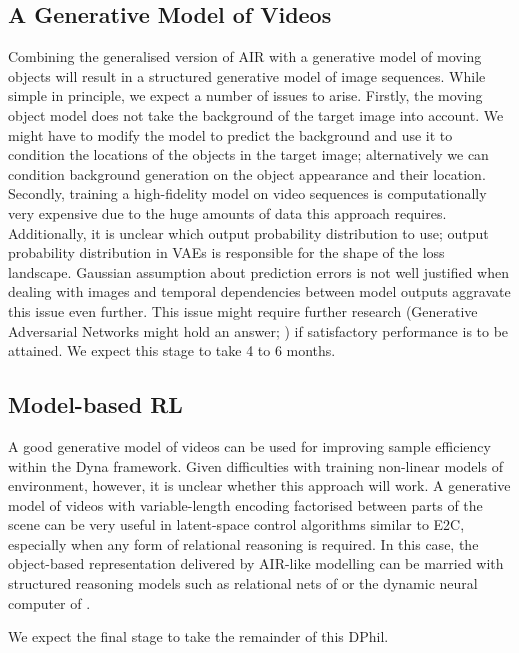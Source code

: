     \subsection{A Generative Model of Videos}
        Combining the generalised version of AIR with a generative model of moving objects will result in a structured generative model of image sequences. While simple in principle, we expect a number of issues to arise. Firstly, the moving object model does not take the background of the target image into account. We might have to modify the model to predict the background and use it to condition the locations of the objects in the target image; alternatively we can condition background generation on the object appearance and their location. 
        Secondly, training a high-fidelity model on video sequences is computationally very expensive due to the huge amounts of data this approach requires.
        Additionally, it is unclear which output probability distribution to use; output probability distribution in VAEs is responsible for the shape of the loss landscape. Gaussian assumption about prediction errors is not well justified when dealing with images and temporal dependencies between model outputs aggravate this issue even further. This issue might require further research (Generative Adversarial Networks might hold an answer; \cite{Wenzhe2016}) if satisfactory performance is to be attained. We expect this stage to take 4 to 6 months.
    
    \subsection{Model-based RL}
        A good generative model of videos can be used for improving sample efficiency within the Dyna framework. Given difficulties with training non-linear models of environment, however, it is unclear whether this approach will work. A generative model of videos with variable-length encoding factorised between parts of the scene can be very useful in latent-space control algorithms similar to E2C, especially when any form of relational reasoning is required. In this case, the object-based representation delivered by AIR-like modelling can be married with structured reasoning models such as relational nets of \cite{Santoro2017} or the dynamic neural computer of \cite{Graves2016}.
        
        
        We expect the final stage to take the remainder of this DPhil.








